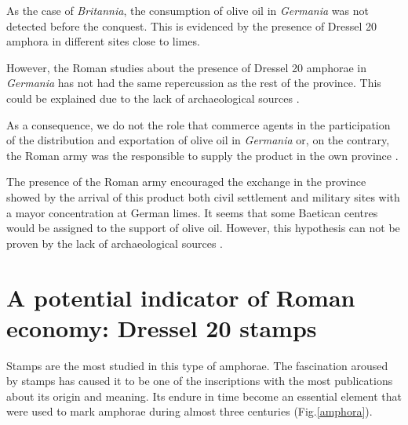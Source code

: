 \documentclass[review]{elsarticle}
\begin{document}
As the case of \textit{Britannia}, the consumption of olive oil in \textit{Germania} was not detected before the conquest. This is evidenced by the presence of Dressel 20 amphora in different sites close to limes. 

However, the Roman studies about the presence of Dressel 20 amphorae in \textit{Germania} has not had the same repercussion as the rest of the province. This could be explained due to the lack of archaeological sources \citep{horacio2010llegada}.
  

As a consequence, we do not the role that commerce agents in the participation of the distribution and exportation of olive oil in \textit{Germania} or, on the contrary, the Roman army was the responsible to supply the product in the own province \citep[156]{remesal_germn_2010}. 

The presence of the Roman army encouraged the exchange in the province showed by the arrival of this product both civil settlement and military sites with a mayor concentration at German limes. It seems that some Baetican centres would be assigned to the support of olive oil. However, this hypothesis can not be proven by the lack of archaeological sources \citep[125]{remesal_concierto}. 


\section{A potential indicator of Roman economy: Dressel 20 stamps}

Stamps are the most studied in this type of amphorae. The fascination aroused by stamps has caused it to be one of the inscriptions with the most publications about its origin and meaning. Its endure in time become an essential element that were used to mark amphorae during almost three centuries \citep{remesal_sellar_2016} (Fig.\ref{amphora}). 
\end{document}
